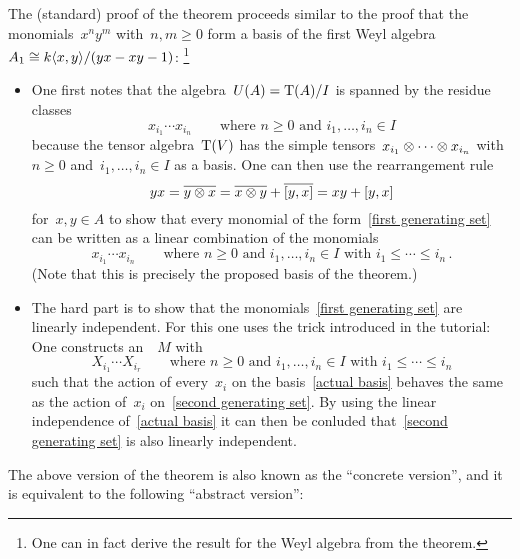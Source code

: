 The (standard) proof of the {\pbw} theorem proceeds similar to the proof that the monomials~$x^n y^m$ with~$n, m \geq 0$ form a basis of the first Weyl algebra~$A_1 \cong k\langle x, y\rangle/(yx - xy - 1)$:%
\footnote{One can in fact derive the result for the Weyl algebra from the {\pbw} theorem.}
\begin{itemize}
  \item
    One first notes that the algebra~$U(A) = \operatorname{T}(A)/I$ is spanned by the residue classes
    \begin{equation}
      \label{first generating set}
      x_{i_1} \dotsm x_{i_n}
      \qquad
      \text{where~$n \geq 0$ and~$i_1, \dotsc, i_n \in I$}
    \end{equation}
    because the tensor algebra~$\operatorname{T}(V)$ has the simple tensors~$x_{i_1} \otimes \dotsb \otimes x_{i_n}$ with~$n \geq 0$ and~$i_1, \dotsc, i_n \in I$ as a basis.
    One can then use the rearrangement rule
    \[
        y x
      = \overline{y \otimes x}
      = \overline{x \otimes y} + \overline{[y,x]}
      = x y + [y,x]
    \]
    for~$x, y \in A$ to show that every monomial of the form~\eqref{first generating set} can be written as a linear combination of the monomials
    \begin{equation}
      \label{second generating set}
      x_{i_1} \dotsm x_{i_n}
      \qquad
      \text{where~$n \geq 0$ and~$i_1, \dotsc, i_n \in I$ with~$i_1 \leq \dotsb \leq i_n$} \,.
    \end{equation}
    (Note that this is precisely the proposed basis of the {\pbw} theorem.)
  \item
    The hard part is to show that the monomials~\eqref{first generating set} are linearly independent.
    For this one uses the trick introduced in the tutorial:
    One constructs an~{}~$M$ with~{\kbasis}
    \begin{equation}
      \label{actual basis}
      X_{i_1} \dotsm X_{i_r}
      \qquad
      \text{where~$n \geq 0$ and~$i_1, \dotsc, i_n \in I$ with~$i_1 \leq \dotsb \leq i_n$}
    \end{equation}
    such that the action of every~$x_i$ on the basis~\eqref{actual basis} behaves the same as the action of~$x_i$ on~\eqref{second generating set}.
    By using the linear independence of~\eqref{actual basis} it can then be conluded that~\eqref{second generating set} is also linearly independent.
\end{itemize}


The above version of the {\pbw} theorem is also known as the \enquote{concrete version}, and it is equivalent to the following \enquote{abstract version}:

